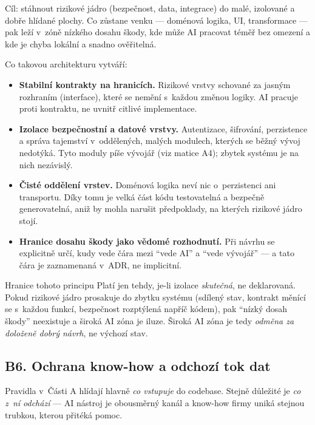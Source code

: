 \begin{calloutplain}[green]
Cíl: stáhnout rizikové jádro (bezpečnost, data, integrace) do malé, izolované a dobře hlídané plochy.
Co zůstane venku --- doménová logika, UI, transformace --- pak leží v~zóně nízkého dosahu škody, kde může AI pracovat téměř bez omezení a kde je chyba lokální a snadno ověřitelná.
\end{calloutplain}

\medskip
Co takovou architekturu vytváří:

\begin{itemize}
\item \textbf{Stabilní kontrakty na hranicích.}
Rizikové vrstvy schované za jasným rozhraním (interface), které se nemění s~každou změnou logiky.
AI pracuje proti kontraktu, ne uvnitř citlivé implementace.
\item \textbf{Izolace bezpečnostní a datové vrstvy.}
Autentizace, šifrování, perzistence a správa tajemství v~oddělených, malých modulech, kterých se běžný vývoj nedotýká.
Tyto moduly píše vývojář (viz matice A4); zbytek systému je na nich nezávislý.
\item \textbf{Čisté oddělení vrstev.}
Doménová logika neví nic o~perzistenci ani transportu.
Díky tomu je velká část kódu testovatelná a bezpečně generovatelná, aniž by mohla narušit předpoklady, na kterých rizikové jádro stojí.
\item \textbf{Hranice dosahu škody jako vědomé rozhodnutí.}
Při návrhu se explicitně určí, kudy vede čára mezi \enquote{vede AI} a \enquote{vede vývojář} --- a tato čára je zaznamenaná v~ADR, ne implicitní.
\end{itemize}

\begin{callout}[amber]{Hranice tohoto principu}
Platí jen tehdy, je-li izolace \emph{skutečná}, ne deklarovaná.
Pokud rizikové jádro prosakuje do zbytku systému (sdílený stav, kontrakt měnící se s~každou funkcí, bezpečnost rozptýlená napříč kódem), pak \enquote{nízký dosah škody} neexistuje a široká AI zóna je iluze.
Široká AI zóna je tedy \emph{odměna za doloženě dobrý návrh}, ne výchozí stav.
\end{callout}

\subsection{B6. Ochrana know-how a odchozí tok dat}

Pravidla v~Části A hlídají hlavně \emph{co vstupuje} do codebase.
Stejně důležité je \emph{co z~ní odchází} --- AI nástroj je obousměrný kanál a know-how firmy uniká stejnou trubkou, kterou přitéká pomoc.

